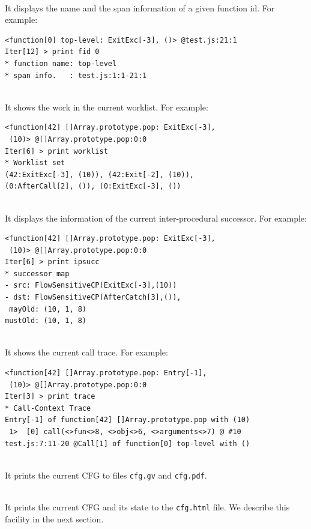 \medskip\noindent
{}\\[.2em]
It displays the name and the span information of
a given function id.  For example:
{\small
\begin{verbatim}
<function[0] top-level: ExitExc[-3], ()> @test.js:21:1
Iter[12] > print fid 0
* function name: top-level
* span info.   : test.js:1:1-21:1
\end{verbatim}
}

\medskip\noindent
{}\\[.2em]
It shows the work in the current worklist.  For example:
{\small
\begin{verbatim}
<function[42] []Array.prototype.pop: ExitExc[-3],
 (10)> @[]Array.prototype.pop:0:0
Iter[6] > print worklist
* Worklist set
(42:ExitExc[-3], (10)), (42:Exit[-2], (10)),
(0:AfterCall[2], ()), (0:ExitExc[-3], ())
\end{verbatim}
}

\medskip\noindent
{}\\[.2em]
It displays the information of the current inter-procedural successor.
For example:
{\small
\begin{verbatim}
<function[42] []Array.prototype.pop: ExitExc[-3],
 (10)> @[]Array.prototype.pop:0:0
Iter[6] > print ipsucc
* successor map
- src: FlowSensitiveCP(ExitExc[-3],(10))
- dst: FlowSensitiveCP(AfterCatch[3],()),
 mayOld: (10, 1, 8)
mustOld: (10, 1, 8)
\end{verbatim}
}

\medskip\noindent
{}\\[.2em]
It shows the current call trace.  For example:
{\small
\begin{verbatim}
<function[42] []Array.prototype.pop: Entry[-1],
 (10)> @[]Array.prototype.pop:0:0
Iter[3] > print trace
* Call-Context Trace
Entry[-1] of function[42] []Array.prototype.pop with (10)
 1>  [0] call(<>fun<>8, <>obj<>6, <>arguments<>7) @ #10
test.js:7:11-20 @Call[1] of function[0] top-level with ()
\end{verbatim}
}

\medskip\noindent
{}\\[.2em]
It prints the current CFG to files \verb!cfg.gv! and \verb!cfg.pdf!.

\medskip\noindent
{}\\[.2em]
It prints the current CFG and its state to the \verb!cfg.html! file.
We describe this facility in the next section.

